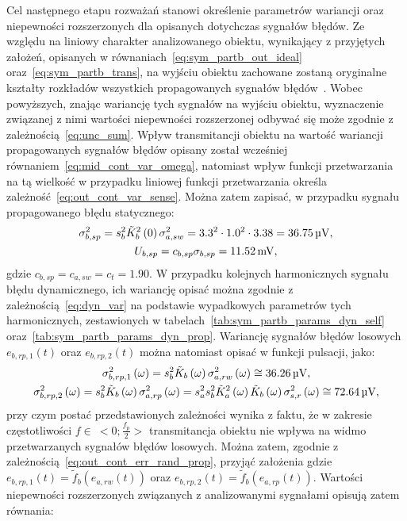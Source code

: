 Cel następnego etapu rozważań stanowi określenie parametrów wariancji oraz niepewności rozszerzonych dla opisanych dotychczas sygnałów błędów. Ze względu na liniowy charakter analizowanego obiektu, wynikający z przyjętych założeń, opisanych w równaniach~\eqref{eq:sym_partb_out_ideal} oraz~\eqref{eq:sym_partb_trans}, na wyjściu obiektu zachowane zostaną oryginalne kształty rozkładów wszystkich propagowanych sygnałów błędów~\cite{grimmett_probability}. Wobec powyższych, znając wariancję tych sygnałów na wyjściu obiektu, wyznaczenie związanej z nimi wartości niepewności rozszerzonej odbywać się może zgodnie z zależnością~\eqref{eq:unc_sum}. Wpływ transmitancji obiektu na wartość wariancji propagowanych sygnałów błędów opisany został wcześniej równaniem~\eqref{eq:mid_cont_var_omega}, natomiast wpływ funkcji przetwarzania na tą wielkość w przypadku liniowej funkcji przetwarzania określa zależność~\eqref{eq:out_cont_var_sense}. Można zatem zapisać, w przypadku sygnału propagowanego błędu statycznego:
\begin{gather}
\sigma_{b,sp}^{2} = s_{b}^{2} \tilde{K}_{b}^{2} \left(0\right) \sigma_{a,sw}^{2} = 3.3^{2} \cdot 1.0^{2} \cdot 3.38 = \qty{36.75}{\micro V} \label{eq:sym_partb_var_stat_prop}, \\
U_{b,sp} = c_{b,sp} \sigma_{b,sp} = \qty{11.52}{mV} \label{eq:sym_partb_unc_stat_prop},
\end{gather}
gdzie $c_{b,sp} = c_{a,sw} = c_{t} = 1.90$. W przypadku kolejnych harmonicznych sygnału błędu dynamicznego, ich wariancję opisać można zgodnie z zależnością~\eqref{eq:dyn_var} na podstawie wypadkowych parametrów tych harmonicznych, zestawionych w tabelach~\ref{tab:sym_partb_params_dyn_self} oraz~\ref{tab:sym_partb_params_dyn_prop}. Wariancję sygnałów błędów losowych $e_{b,rp,1}(t)$ oraz $e_{b,rp,2}(t)$ można natomiast opisać w funkcji pulsacji, jako:
\begin{gather}
\sigma_{b,rp,1}^{2} \left(\omega\right) = s_{b}^{2} \tilde{K}_{b} \left(\omega\right) \sigma_{a,rw}^{2} \left(\omega\right) \cong \qty{36.26}{\micro V} \label{eq:sym_partb_var_rand_prop_1}, \\
\sigma_{b,rp,2}^{2} \left(\omega\right) = s_{b}^{2} \tilde{K}_{b} \left(\omega\right) \sigma_{a,rp}^{2} \left(\omega\right) = s_{a}^{2} s_{b}^{2} \tilde{K}_{a}^{2} \left(\omega\right) \tilde{K}_{b} \left(\omega\right) \sigma_{s,r}^{2} \left(\omega\right) \cong \qty{72.64}{\micro V} \label{eq:sym_partb_var_rand_prop_2},
\end{gather}
przy czym postać przedstawionych zależności wynika z faktu, że w zakresie częstotliwości $f \in~<0;\frac{f_{p}}{2}>$ transmitancja obiektu nie wpływa na widmo przetwarzanych sygnałów błędów losowych. Można zatem, zgodnie z zależnością~\eqref{eq:out_cont_err_rand_prop}, przyjąć założenia gdzie $e_{b,rp,1}(t) = \tilde{f}_{b}(e_{a,rw}(t))$ oraz $e_{b,rp,2}(t) = \tilde{f}_{b}(e_{a,rp}(t))$. Wartości niepewności rozszerzonych związanych z analizowanymi sygnałami opisują zatem równania:
